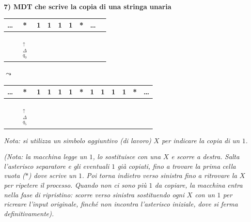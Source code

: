 \vspace{0.6cm}
\textbf{7) MDT che scrive la copia di una stringa unaria}

\begin{center}
\begin{tabular}{c|c|c|c|c|c|c|c|c}
\hline
\dots & * & 1 & 1 & 1 & 1 & * & \dots & \\
\hline
\multicolumn{1}{c}{} & \multicolumn{1}{c}{$\underset{\substack{\uparrow \\ \Delta \\ q_0}}{\phantom{*}}$} & \multicolumn{7}{c}{} \\
\end{tabular}
$\leadsto$
\begin{tabular}{c|c|c|c|c|c|c|c|c|c|c|c|c}
\hline
\dots & * & 1 & 1 & 1 & 1 & * & 1 & 1 & 1 & 1 & * & \dots \\
\hline
\multicolumn{1}{c}{} & \multicolumn{1}{c}{$\underset{\substack{\uparrow \\ \Delta \\ q_5}}{\phantom{*}}$} & \multicolumn{11}{c}{} \\
\end{tabular}
\end{center}
\textit{Nota: si utilizza un simbolo aggiuntivo (di lavoro) $X$ per indicare la copia di un $1$.}
\begin{center}
\end{center}

\textit{(Nota: la macchina legge un $1$, lo sostituisce con una $X$ e scorre a destra. Salta l'asterisco separatore e gli eventuali $1$ già copiati, fino a trovare la prima cella vuota ($*$) dove scrive un $1$. Poi torna indietro verso sinistra fino a ritrovare la $X$ per ripetere il processo. Quando non ci sono più $1$ da copiare, la macchina entra nella fase di ripristino: scorre verso sinistra sostituendo ogni $X$ con un $1$ per ricreare l'input originale, finché non incontra l'asterisco iniziale, dove si ferma definitivamente).}


